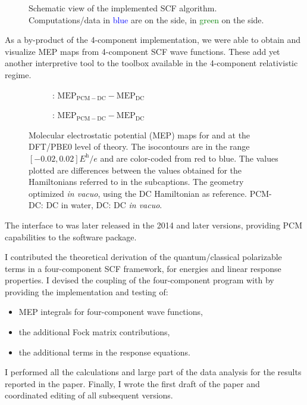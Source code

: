 \begin{figure}[!htb]
\centering
\scalebox{0.8}{}
\caption[Modular approach to programming a \acs{PCM} functionality into an existing \acs{SCF} code.]{
  Schematic view of the implemented SCF algorithm. Computations/data in
  \textcolor{Blue}{blue} are on the \pcmsolver side, in
  \textcolor{Green}{green} on the \DIRAC side.
  }
\label{fig:algorithm}
\end{figure}

As a by-product of the 4-component implementation, we were able to obtain and visualize \acs{MEP} maps
from 4-component \acs{SCF} wave functions. These add yet another interpretive tool to the toolbox available
in the 4-component relativistic regime.
\begin{figure}
\centering
\begin{subfigure}[b]{0.5\textwidth}
\caption{: $\mathrm{MEP}_\mathrm{PCM-DC} - \mathrm{MEP}_\mathrm{DC}$}
\label{fig:H2Odiff_pcmdc-dc}
\end{subfigure}%
\begin{subfigure}[b]{0.5\textwidth}
\caption{: $\mathrm{MEP}_\mathrm{PCM-DC} - \mathrm{MEP}_\mathrm{DC}$}
\label{fig:H2Podiff_pcmdc-dc}
\end{subfigure}
\caption[Molecular electrostatic potential (\acs{MEP}) maps for  and  at
  the \acs{DFT}/PBE0 level of theory.]{
  Molecular electrostatic potential (\acs{MEP}) maps for  and  at
  the \acs{DFT}/PBE0 level of theory.
  The isocontours are in the range $[-0.02, 0.02] \si{\hartree\per\elementarycharge}$ and are
  color-coded from red to blue.
  The values plotted are differences between the values obtained for the
  Hamiltonians referred to in the subcaptions. The geometry optimized \emph{in
  vacuo}, using the \acl{DC} Hamiltonian as reference.
  \acs{PCM}-\acs{DC}: \acl{DC} in water, \acs{DC}: \acl{DC} \emph{in vacuo}.}
\label{fig:MEP_maps}
\end{figure}
The interface to \DIRAC was later released in the 2014 and later versions,
providing \acs{PCM} capabilities to the software package.

I contributed the theoretical derivation of the quantum/classical polarizable
terms in a four-component \acs{SCF} framework, for energies and linear response
properties. I devised the coupling of the four-component program \DIRAC with
\pcmsolver by providing the implementation and testing of:
\begin{itemize}
  \item \acs{MEP} integrals for four-component wave functions,
  \item the additional Fock matrix contributions,
  \item the additional terms in the response equations.
\end{itemize}
I performed all the calculations and large part of the data analysis
for the results reported in the paper.
Finally, I wrote the first draft of the paper and coordinated editing of
all subsequent versions.

